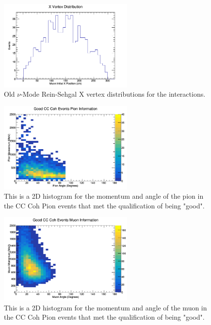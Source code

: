 \documentclass[11pt]{article}
\begin{document}
\begin{figure}[H]
\centering
\includegraphics[width=0.6\textwidth]{OldNMReinSehgalImages/4-XVertexDistributionNMORS.png}
\caption{Old $\nu$-Mode Rein-Sehgal X vertex distributions for the interactions.}
\end{figure}

\begin{figure}[H]
\centering
\includegraphics[width=0.6\textwidth]{OldNMReinSehgalImages/5-GoodCCCohPionInfoNMORS.png}
\caption{This is a 2D histogram for the momentum and angle of the pion in the CC Coh Pion events that met the qualification of being "good".}
\end{figure}

\begin{figure}[H]
\centering
\includegraphics[width=0.6\textwidth]{OldNMReinSehgalImages/6-GoodCCCohMuonInfoNMORS.png}
\caption{This is a 2D histogram for the momentum and angle of the muon in the CC Coh Pion events that met the qualification of being "good".}
\end{figure}
\end{document}
